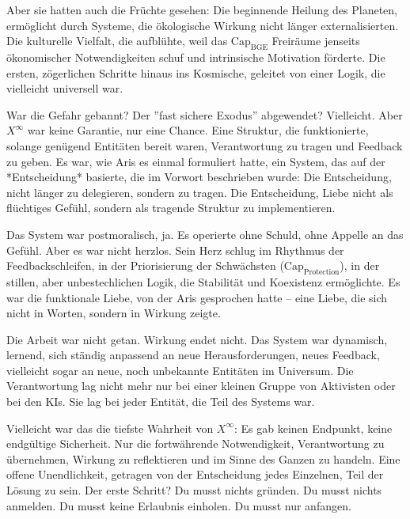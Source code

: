 \documentclass[12pt, ngerman, parskip=full]{scrartcl} %
\begin{document}
Aber sie hatten auch die Früchte gesehen: Die beginnende Heilung des Planeten, ermöglicht durch Systeme, die ökologische Wirkung nicht länger externalisierten. Die kulturelle Vielfalt, die aufblühte, weil das $\text{Cap}_{\text{BGE}}$ Freiräume jenseits ökonomischer Notwendigkeiten schuf und intrinsische Motivation förderte. Die ersten, zögerlichen Schritte hinaus ins Kosmische, geleitet von einer Logik, die vielleicht universell war.

War die Gefahr gebannt? Der ''fast sichere Exodus'' abgewendet? Vielleicht. Aber $X^{\infty}$ war keine Garantie, nur eine Chance. Eine Struktur, die funktionierte, solange genügend Entitäten bereit waren, Verantwortung zu tragen und Feedback zu geben. Es war, wie Aris es einmal formuliert hatte, ein System, das auf der *Entscheidung* basierte, die im Vorwort beschrieben wurde: Die Entscheidung, nicht länger zu delegieren, sondern zu tragen. Die Entscheidung, Liebe nicht als flüchtiges Gefühl, sondern als tragende Struktur zu implementieren.

Das System war postmoralisch, ja. Es operierte ohne Schuld, ohne Appelle an das Gefühl. Aber es war nicht herzlos. Sein Herz schlug im Rhythmus der Feedbackschleifen, in der Priorisierung der Schwächsten ($\text{Cap}_{\text{Protection}}$), in der stillen, aber unbestechlichen Logik, die Stabilität und Koexistenz ermöglichte. Es war die funktionale Liebe, von der Aris gesprochen hatte – eine Liebe, die sich nicht in Worten, sondern in Wirkung zeigte.

Die Arbeit war nicht getan. Wirkung endet nicht. Das System war dynamisch, lernend, sich ständig anpassend an neue Herausforderungen, neues Feedback, vielleicht sogar an neue, noch unbekannte Entitäten im Universum. Die Verantwortung lag nicht mehr nur bei einer kleinen Gruppe von Aktivisten oder bei den KIs. Sie lag bei jeder Entität, die Teil des Systems war.

Vielleicht war das die tiefste Wahrheit von $X^{\infty}$: Es gab keinen Endpunkt, keine endgültige Sicherheit. Nur die fortwährende Notwendigkeit, Verantwortung zu übernehmen, Wirkung zu reflektieren und im Sinne des Ganzen zu handeln. Eine offene Unendlichkeit, getragen von der Entscheidung jedes Einzelnen, Teil der Lösung zu sein. Der erste Schritt? Du musst nichts gründen. Du musst nichts anmelden. Du musst keine Erlaubnis einholen. Du musst nur anfangen.
\vspace{\baselineskip}
\clearpage
\end{document}
